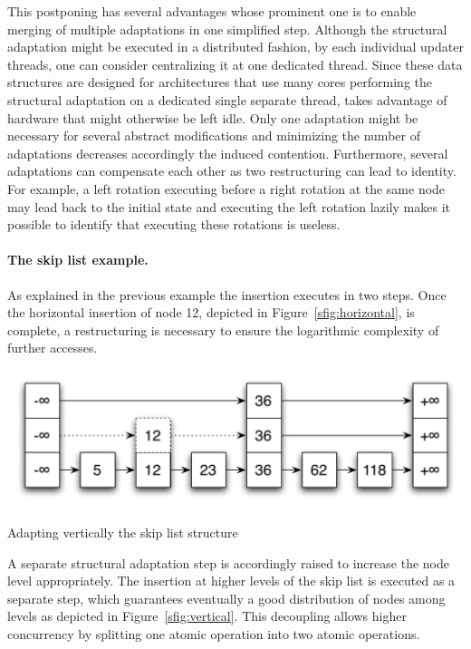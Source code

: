 This postponing has several advantages whose prominent one is to enable merging of multiple
adaptations in one simplified step. Although the structural adaptation might be executed in a 
distributed fashion, by each individual updater threads, one can consider centralizing it at one 
dedicated thread.
Since these data structures are designed for architectures that use many cores
performing the structural adaptation on a dedicated single separate thread, takes advantage of 
hardware that might otherwise be left idle.
Only one adaptation might be necessary for several abstract modifications and minimizing the 
number of 
adaptations decreases accordingly the induced contention. Furthermore, several adaptations can 
compensate each other as two restructuring can lead to identity. For example, a left rotation executing 
before a right rotation at the same node may lead back to the initial state and executing the left rotation 
lazily makes it possible to identify that executing these rotations is useless.

\paragraph{The skip list example.}

As explained in the previous example the insertion executes in two steps. Once the horizontal 
insertion of node 12, depicted in Figure~\ref{sfig:horizontal}, is complete, a restructuring is necessary to 
ensure the logarithmic  complexity of further accesses. 
\begin{floatingfigure}{7.5cm}
\includegraphics[scale=0.35]{CF-general/fig/vertical-insert}
\caption{\footnotesize{Adapting vertically the skip list structure\label{sfig:vertical}}}
\end{floatingfigure}

A separate structural adaptation step is accordingly raised to increase the node level appropriately.
The insertion at higher levels of the skip list is executed as a separate step, which guarantees 
eventually a good distribution of nodes among levels as depicted in Figure~\ref{sfig:vertical}.
This decoupling allows higher concurrency by splitting one atomic operation into two atomic operations.

